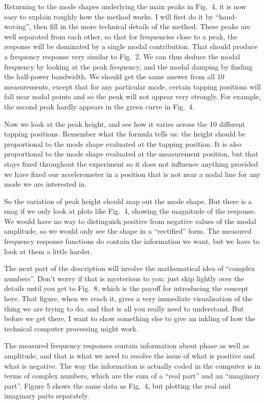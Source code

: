   Returning to the mode shapes underlying the main peaks in Fig.\ 4, it is now 
  easy to explain roughly how the method works. I will first do it by 
  “hand-waving”, then fill in the more technical details of the method. These 
  peaks are well separated from each other, so that for frequencies close to a 
  peak, the response will be dominated by a single modal contribution. That 
  should produce a frequency response very similar to Fig.\ 2. We can thus 
  deduce the modal frequency by looking at the peak frequency, and the modal 
  damping by finding the half-power bandwidth. We should get the same answer 
  from all 10 measurements, except that for any particular mode, certain 
  tapping positions will fall near nodal points and so the peak will not appear 
  very strongly. For example, the second peak hardly appears in the green curve 
  in Fig.\ 4. 

  Now we look at the peak height, and see how it varies across the 10 different 
  tapping positions. Remember what the formula tells us: the height should be 
  proportional to the mode shape evaluated at the tapping position. It is also 
  proportional to the mode shape evaluated at the measurement position, but 
  that stays fixed throughout the experiment so it does not influence anything 
  provided we have fixed our accelerometer in a position that is not near a 
  nodal line for any mode we are interested in. 

  So the variation of peak height should map out the mode shape. But there is a 
  snag if we only look at plots like Fig.\ 4, showing the magnitude of the 
  response. We would have no way to distinguish positive from negative values 
  of the modal amplitude, so we would only see the shape in a “rectified” form. 
  The measured frequency response functions do contain the information we want, 
  but we have to look at them a little harder. 

  The next part of the description will involve the mathematical idea of 
  “complex numbers”. Don’t worry if that is mysterious to you: just skip 
  lightly over the details until you get to Fig.\ 8, which is the payoff for 
  introducing the concept here. That figure, when we reach it, gives a very 
  immediate visualisation of the thing we are trying to do, and that is all you 
  really need to understand. But before we get there, I want to show something 
  else to give an inkling of how the technical computer processing might work. 

  The measured frequency responses contain information about phase as well as 
  amplitude, and that is what we need to resolve the issue of what is positive 
  and what is negative. The way the information is actually coded in the 
  computer is in terms of complex numbers, which are the sum of a “real part” 
  and an “imaginary part”. Figure 5 shows the same data as Fig.\ 4, but 
  plotting the real and imaginary parts separately. 

